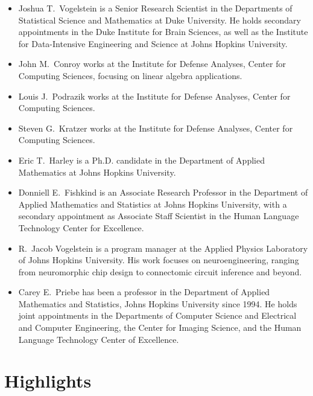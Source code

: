 \documentclass[preprint,11pt]{elsarticle}
\begin{document}
\begin{itemize}
	\item Joshua T.~Vogelstein is a Senior Research Scientist in the Departments of Statistical Science and Mathematics at Duke University.  He holds secondary appointments in the Duke Institute for Brain Sciences, as well as the
	Institute for Data-Intensive Engineering and Science at Johns Hopkins University. 
	\item John M.~Conroy works at the Institute for Defense Analyses, Center for Computing Sciences, focusing on linear algebra applications.

	\item Louis J.~Podrazik works at the Institute for Defense Analyses, Center for Computing Sciences.
 
	\item Steven G.~Kratzer works at the  Institute for Defense Analyses, Center for Computing Sciences.

	\item Eric T.~Harley is a Ph.D. candidate in the Department of Applied Mathematics at Johns Hopkins University.  

	\item Donniell E.~Fishkind is an Associate Research Professor in the Department of 
Applied Mathematics and Statistics at Johns Hopkins University, with a secondary appointment as Associate Staff Scientist in the Human Language Technology Center for Excellence.

	\item R.~Jacob Vogelstein is a program manager at the Applied Physics Laboratory of Johns Hopkins University.  His work focuses on neuroengineering, ranging from neuromorphic chip design to connectomic circuit inference and beyond.


	\item Carey E.~Priebe has been a professor in the Department of Applied Mathematics and Statistics, Johns Hopkins University since 1994. He  holds joint appointments in the Departments of Computer Science and Electrical and Computer Engineering, the Center for Imaging Science, and the Human Language Technology Center of Excellence. 

\end{itemize}


\newpage
\section*{Highlights}
\end{document}
